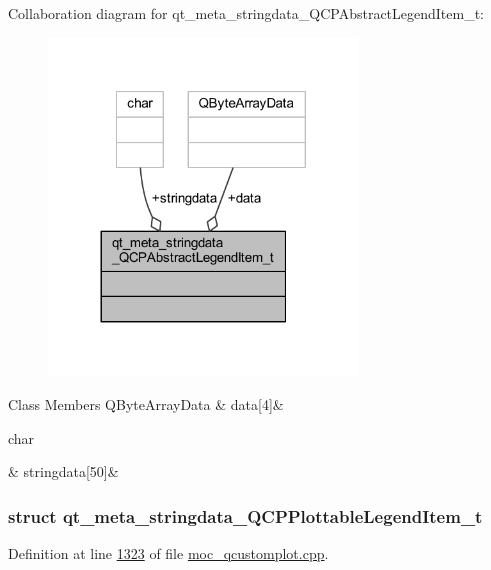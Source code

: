Collaboration diagram for qt\+\_\+meta\+\_\+stringdata\+\_\+\+Q\+C\+P\+Abstract\+Legend\+Item\+\_\+t\+:
\nopagebreak
\begin{figure}[H]
\begin{center}
\leavevmode
\includegraphics[width=233pt]{d7/d25/a00182}
\end{center}
\end{figure}
\begin{DoxyFields}{Class Members}
\hypertarget{a00016_a98fcd80c37c93a0b0b71f18405466d42}{Q\+Byte\+Array\+Data}\label{a00016_a98fcd80c37c93a0b0b71f18405466d42}
&
data\mbox{[}4\mbox{]}&
\\
\hline

\hypertarget{a00016_a007f69edf60f3475c27481b80fb00e7f}{char}\label{a00016_a007f69edf60f3475c27481b80fb00e7f}
&
stringdata\mbox{[}50\mbox{]}&
\\
\hline

\end{DoxyFields}
\label{d4/d3e/a00116}
\hypertarget{a00016_d4/d3e/a00116}{}
\subsubsection{struct qt\+\_\+meta\+\_\+stringdata\+\_\+\+Q\+C\+P\+Plottable\+Legend\+Item\+\_\+t}


Definition at line \hyperlink{a00016_source_l01323}{1323} of file \hyperlink{a00016_source}{moc\+\_\+qcustomplot.\+cpp}.




